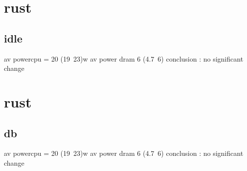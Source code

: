\section*{rust}
\subsection*{idle}
av powercpu = 20 (19~23)w
av power dram 6   (4.7~6)
conclusion : no significant change

\section*{rust}
\subsection*{db}
av powercpu = 20 (19~23)w
av power dram 6   (4.7~6)
conclusion : no significant change
